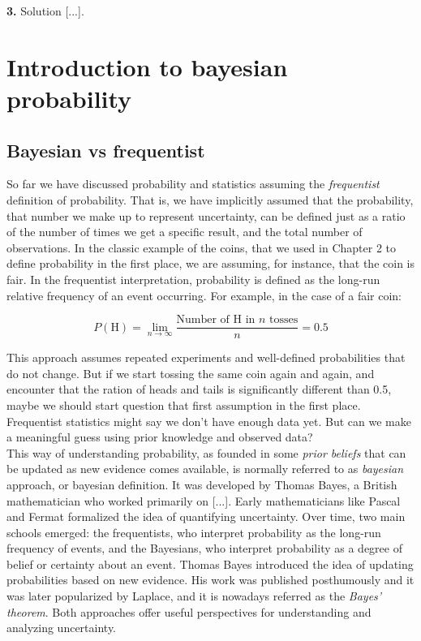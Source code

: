\documentclass{book}
\begin{document}
\textbf{3.} Solution [...].\\



\chapter{Introduction to bayesian probability}

\section{Bayesian vs frequentist}

So far we have discussed probability and statistics assuming the \textit{frequentist} definition of probability. That is, we have implicitly assumed that the probability, that number we make up to represent uncertainty, can be defined just as a ratio of the number of times we get a specific result, and the total number of observations. In the classic example of the coins, that we used in Chapter 2 to define probability in the first place, we are assuming, for instance, that the coin is fair. In the frequentist interpretation, probability is defined as the long-run relative frequency of an event occurring. For example, in the case of a fair coin:

\[
P(\text{H}) = \lim_{n \to \infty} \frac{\text{Number of H in } n \text{ tosses}}{n} = 0.5
\]

This approach assumes repeated experiments and well-defined probabilities that do not change. But if we start tossing the same coin again and again, and encounter that the ration of heads and tails is significantly different than 0.5, maybe we should start question that first assumption in the first place. Frequentist statistics might say we don't have enough data yet. But can we make a meaningful guess using prior knowledge and observed data? \\

This way of understanding probability, as founded in some \textit{prior beliefs} that can be updated as new evidence comes available, is normally referred to as \textit{bayesian} approach, or bayesian definition. It was developed by Thomas Bayes, a British mathematician who worked primarily on [...]. Early mathematicians like Pascal and Fermat formalized the idea of quantifying uncertainty. Over time, two main schools emerged: the frequentists, who interpret probability as the long-run frequency of events, and the Bayesians, who interpret probability as a degree of belief or certainty about an event. Thomas Bayes introduced the idea of updating probabilities based on new evidence. His work was published posthumously and it was later popularized by Laplace, and it is nowadays referred as the \textit{Bayes’ theorem}. Both approaches offer useful perspectives for understanding and analyzing uncertainty.\\
\end{document}
